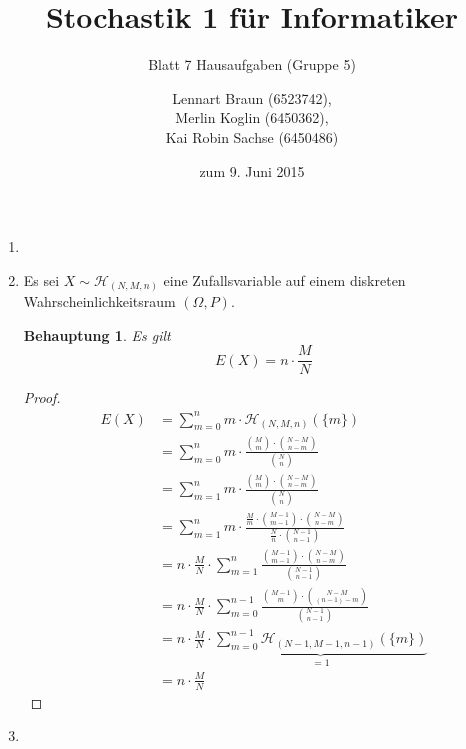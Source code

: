 \documentclass[a4paper]{scrartcl}
\title{Stochastik 1 für Informatiker}
\subtitle{Blatt 7 Hausaufgaben (Gruppe 5)}
\author{
    Lennart Braun (6523742), \\
    Merlin Koglin (6450362), \\
    Kai Robin Sachse (6450486)
}
\date{zum 9. Juni 2015}
\newtheorem*{behaupt}{Behauptung}
\begin{document}
\maketitle

\begin{enumerate}[label=\bfseries\arabic*.]
    \item

    \item
        Es sei $X \sim \mathcal{H}_{(N, M, n)}$ eine Zufallsvariable auf einem
        diskreten Wahrscheinlichkeitsraum $(\Omega, P)$.
        \begin{behaupt}
            Es gilt
            \begin{equation*}
                E(X) = n \cdot \frac{M}{N}
            \end{equation*}
        \end{behaupt}
        \begin{proof}
            \begin{equation*}
                \begin{split}
                    E(X)
                    &= \sum_{m=0}^n m \cdot \mathcal{H}_{(N, M, n)} (\{m\}) \\
                    &= \sum_{m=0}^n m \cdot
                        \frac{\binom{M}{m} \cdot \binom{N-M}{n-m}}
                             {\binom{N}{n}} \\
                    &= \sum_{m=1}^n m \cdot
                        \frac{\binom{M}{m} \cdot \binom{N-M}{n-m}}
                             {\binom{N}{n}} \\
                    &= \sum_{m=1}^n m \cdot
                        \frac{\frac{M}{m} \cdot \binom{M-1}{m-1} \cdot
                        \binom{N-M}{n-m}}{\frac{N}{n} \cdot \binom{N-1}{n-1}} \\
                    &= n \cdot \frac{M}{N} \cdot \sum_{m=1}^n
                        \frac{\binom{M-1}{m-1} \cdot
                        \binom{N-M}{n-m}}{\binom{N-1}{n-1}} \\
                    &= n \cdot \frac{M}{N} \cdot \sum_{m=0}^{n-1}
                        \frac{\binom{M-1}{m} \cdot
                        \binom{N-M}{(n-1) -m}}{\binom{N-1}{n-1}} \\
                    &= n \cdot \frac{M}{N} \cdot \underbrace{\sum_{m=0}^{n-1}
                        \mathcal{H}_{(N-1, M-1, n-1)}(\{m\})}_{= 1} \\
                    &= n \cdot \frac{M}{N}
                \end{split}
            \end{equation*}
        \end{proof}

    \item

\end{enumerate}
\end{document}
